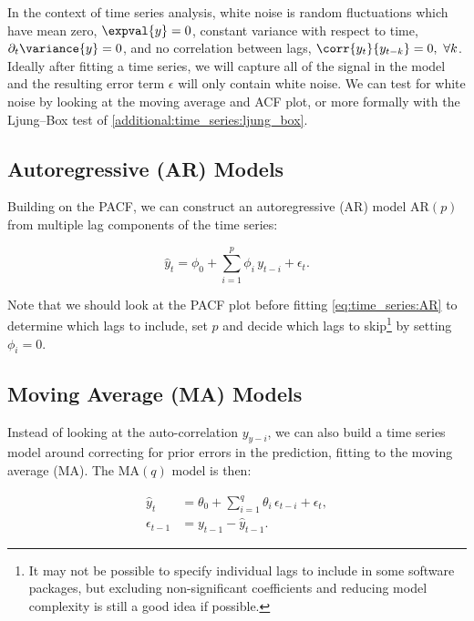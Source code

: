 In the context of time series analysis, white noise is random fluctuations which
have mean zero, $\expval{y} = 0$,
constant variance with respect to time, $\partial_{t} \variance{y} = 0$,
and no correlation between lags, $\corr{y_{t}}{y_{t-k}} = 0,\,\, \forall k$.
Ideally after fitting a time series, we will capture all of the signal
in the model and the resulting error term $\epsilon$ will only contain white noise.
We can test for white noise by looking at the moving average and ACF plot,
or more formally with the Ljung--Box test of \cref{additional:time_series:ljung_box}.

\subsection{Autoregressive (AR) Models}
\label{additional:time_series:AR}
Building on the PACF, we can construct an autoregressive (AR) model $\text{AR}\left(p\right)$
from multiple lag components of the time series:

\begin{equation}\label{eq:time_series:AR}
\hat{y}_{t} = \phi_{0} + \sum_{i=1}^{p} \phi_{i}\, y_{t-i} + \epsilon_{t}.
\end{equation}

Note that we should look at the PACF plot before fitting \cref{eq:time_series:AR}
to determine which lags to include,
\ie set $p$ and decide which lags to skip\footnote{It may not be possible
to specify individual lags to include in some software packages,
but excluding non-significant coefficients and reducing model complexity
is still a good idea if possible.} by setting $\phi_{i} = 0$.

\subsection{Moving Average (MA) Models}
\label{additional:time_series:MA}

Instead of looking at the auto-correlation $y_{y-i}$,
we can also build a time series model around
correcting for prior errors in the prediction,
\ie fitting to the moving average (MA).
The $\text{MA}\left(q\right)$ model
is then:

\begin{subequations}\label{eq:time_series:MA}
\begin{align}
\hat{y}_{t} &= \theta_{0} + \sum_{i=1}^{q} \theta_{i}\, \epsilon_{t-i} + \epsilon_{t}, \label{eq:time_series:MA_y} \\
\epsilon_{t-1} &= y_{t-1} - \hat{y}_{t-1}. \label{eq:time_series:MA_epsilon}
\end{align}
\end{subequations}

